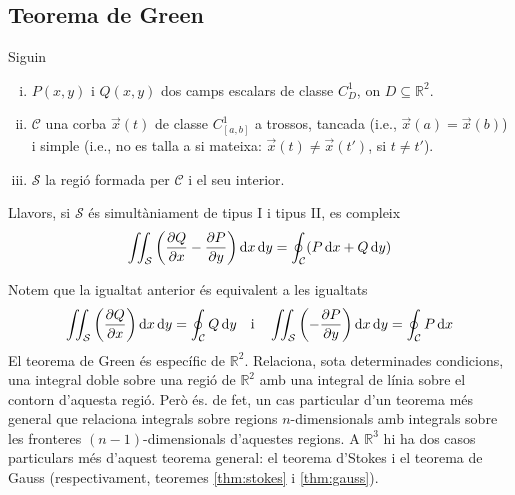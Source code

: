 \subsection{Teorema de Green}
\begin{thm}[de Green]
	Siguin
	\begin{enumerate}[i)]
		\item $P(x,y)$ i $Q(x,y)$ dos camps escalars de classe $C^{1}_{D}$, on $D \subseteq \mathbb{R}^{2}$.
		\item $\mathcal{C}$ una corba $\vec{x}(t)$ de classe $C^{1}_{[a,b]}$ a trossos, tancada (i.e., $\vec{x}(a) = \vec{x}(b)$) i simple (i.e., no es talla a si mateixa: $\vec{x}(t) \neq \vec{x}(t')$, si $t \neq t'$).
		\item $\mathcal{S}$ la regió formada per $\mathcal{C}$ i el seu interior.
	\end{enumerate}
	Llavors, si $\mathcal{S}$ és simultàniament de tipus I i tipus II, es compleix
	\begin{align}
		\iint_{\mathcal{S}} \left( \frac{\partial Q}{\partial x} - \frac{\partial P}{\partial y} \right) \mathop{}\!\mathrm{d} x \mathop{}\!\mathrm{d} y = \oint_{\mathcal{C}} (P \mathop{}\!\mathrm{d} x + Q \mathop{}\!\mathrm{d} y)
	\end{align}
\end{thm}
Notem que la igualtat anterior és equivalent a les igualtats
\begin{align}
	\iint_{\mathcal{S}} \left( \frac{\partial Q}{\partial x} \right) \mathop{}\!\mathrm{d} x \mathop{}\!\mathrm{d} y = \oint_{\mathcal{C}} Q \mathop{}\!\mathrm{d} y \quad \text{i} \quad \iint_{\mathcal{S}} \left( - \frac{\partial P}{\partial y} \right) \mathop{}\!\mathrm{d} x \mathop{}\!\mathrm{d} y = \oint_{\mathcal{C}} P \mathop{}\!\mathrm{d} x
\end{align}
El teorema de Green és específic de $\mathbb{R}^{2}$. Relaciona, sota determinades condicions, una integral doble sobre una regió de $\mathbb{R}^{2}$ amb una integral de línia sobre el contorn d'aquesta regió. Però és. de fet, un cas particular d'un teorema més general que relaciona integrals sobre regions $n$-dimensionals amb integrals sobre les fronteres $(n-1)$-dimensionals d'aquestes regions. A $\mathbb{R}^{3}$ hi ha dos casos particulars més d'aquest teorema general: el teorema d'Stokes i el teorema de Gauss (respectivament, teoremes \ref{thm:stokes} i \ref{thm:gauss}).

